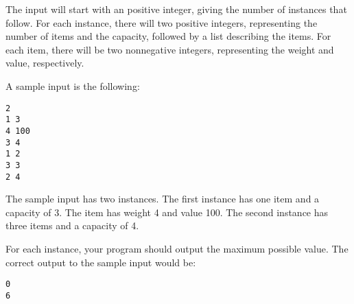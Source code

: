 \documentclass[solutionbox,answers]{exam}
\begin{document}
\begin{questions}
The input will start with an positive integer, giving the number of instances that follow. For each
instance, there will two positive integers, representing the number of items and the capacity, followed by a list describing the items.
For each item, there will be two nonnegative integers, representing the weight and value, respectively.

A sample input is the following:

\begin{verbatim}
2
1 3
4 100
3 4
1 2
3 3
2 4
\end{verbatim}
The sample input has two instances. The first instance has one item and a capacity of 3. The item has weight 4 and value 100. 
The second instance has three items and a capacity of 4.

For each instance, your program should output the maximum possible value.
The correct output to the sample input would be:

\begin{verbatim}
0 
6
\end{verbatim}

\end{questions}
\end{document}
